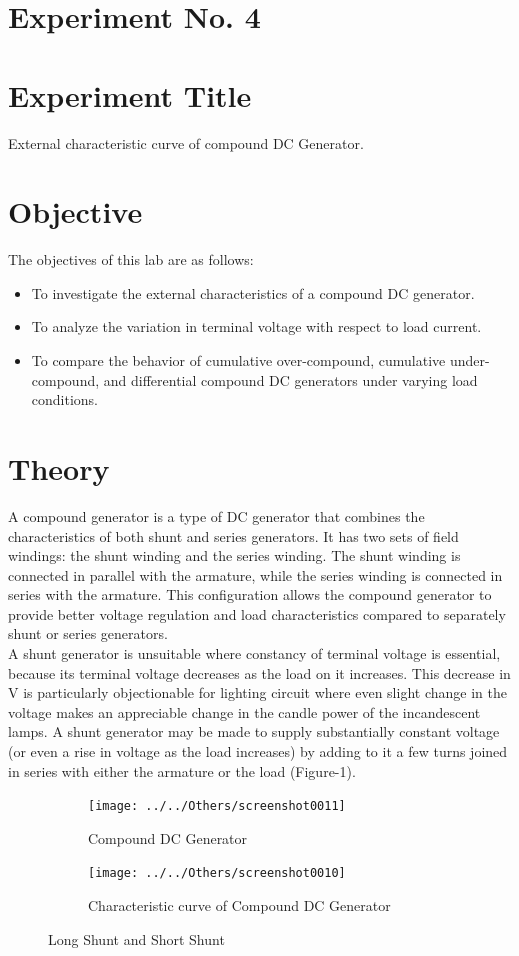 \documentclass[a4paper,12pt]{article}
\begin{document}
	\section{Experiment No. 4}
	
	\section{Experiment Title }
	External characteristic curve of compound DC Generator.
	\section{Objective}
	
	The objectives of this lab are as follows:
	\begin{itemize}
		\item To investigate the external characteristics of a compound DC generator.
		\item To analyze the variation in terminal voltage with respect to load current.
		\item To compare the behavior of cumulative over-compound, cumulative under-compound, and differential compound DC generators under varying load conditions.
	\end{itemize}
	
	\section{Theory}
	A compound generator is a type of DC generator that combines the characteristics of both shunt and series generators. It has two sets of field windings: the shunt winding and the series winding. The shunt winding is connected in parallel with the armature, while the series winding is connected in series with the armature. This configuration allows the compound generator to provide better voltage regulation and load characteristics compared to separately shunt or series generators.\\
A shunt generator is unsuitable where constancy of terminal voltage is essential, because its terminal voltage decreases as the load on it increases. This decrease in V is particularly objectionable for lighting circuit where even slight change in the voltage makes an appreciable change in the candle power of the incandescent lamps. A shunt generator may be made to supply substantially constant voltage (or even a  rise in voltage as the load increases) by adding to it a few turns joined in series with either the armature or the load (Figure-1). \\ 
\begin{figure}[H]
	\centering
	\begin{subfigure}[t]{0.48\textwidth}
		\centering
		\texttt{[image: ../../Others/screenshot0011]}
		\caption{Compound DC Generator}
	\end{subfigure}
	\hfill
	\begin{subfigure}[t]{0.48\textwidth}
		\centering
	\texttt{[image: ../../Others/screenshot0010]}
	\caption{ Characteristic curve of Compound DC Generator}
	\end{subfigure}
	
	\caption{Long Shunt and Short Shunt }
\end{figure}
\end{document}
